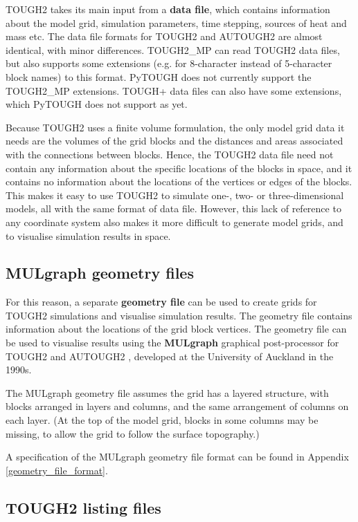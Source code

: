 TOUGH2 takes its main input from a \textbf{data file}, which contains information about the model grid, simulation parameters, time stepping, sources of heat and mass etc.  The data file formats for TOUGH2 and AUTOUGH2 are almost identical, with minor differences.  TOUGH2\_MP can read TOUGH2 data files, but also supports some extensions (e.g. for 8-character instead of 5-character block names) to this format.  PyTOUGH does not currently support the TOUGH2\_MP extensions.  TOUGH+ data files can also have some extensions, which PyTOUGH does not support as yet.

Because TOUGH2 uses a finite volume formulation, the only model grid data it needs are the volumes of the grid blocks and the distances and areas associated with the connections between blocks.  Hence, the TOUGH2 data file need not contain any information about the specific locations of the blocks in space, and it contains no information about the locations of the vertices or edges of the blocks.  This makes it easy to use TOUGH2 to simulate one-, two- or three-dimensional models, all with the same format of data file.  However, this lack of reference to any coordinate system also makes it more difficult to generate model grids, and to visualise simulation results in space.

\subsection{MULgraph geometry files}

For this reason, a separate \textbf{geometry file} can be used to create grids for TOUGH2 simulations and visualise simulation results.  The geometry file contains information about the locations of the grid block vertices.  The geometry file can be used to visualise results using the \textbf{MULgraph} graphical post-processor for TOUGH2 and AUTOUGH2 \citep{mulgraph}, developed at the University of Auckland in the 1990s.

The MULgraph geometry file assumes the grid has a layered structure, with blocks arranged in layers and columns, and the same arrangement of columns on each layer.  (At the top of the model grid, blocks in some columns may be missing, to allow the grid to follow the surface topography.)

A specification of the MULgraph geometry file format can be found in Appendix \ref{geometry_file_format}.

\subsection{TOUGH2 listing files}

